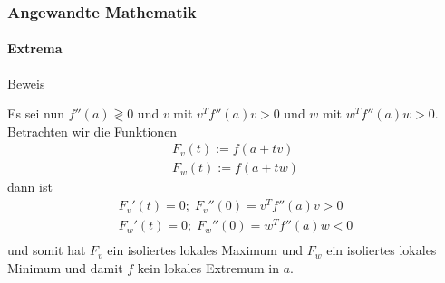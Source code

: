 \documentclass{beamer}
\begin{document}
\begin{frame}
    \frametitle{Angewandte Mathematik}
\framesubtitle{Extrema}
    \begin{block}{Beweis}


Es sei nun $f''(a) \gtrless 0$ und $v$ mit $v^T f''(a) v > 0$ und $w$ mit $w^T f''(a) w > 0$. Betrachten wir die Funktionen
\begin{align*}
F_v (t) := f(a + tv) \\
F_w(t) := f(a +tw)
\end{align*}
dann ist 
\begin{align*}
F_v' (t) = 0; \; F_v''(0) = v^T f''(a) v > 0 \\
F_w' (t) = 0; \; F_w''(0) = w^T f''(a) w < 0 \\
\end{align*}
und somit hat $F_v$ ein isoliertes lokales Maximum und $F_w$ ein isoliertes lokales Minimum und damit $f$ kein lokales Extremum  in  $a$.
\end{block}
 \end{frame}
\end{document}
